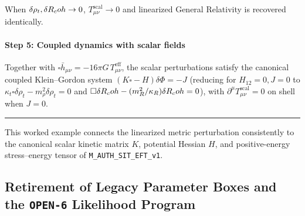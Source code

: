 When $\delta\rho_t, \delta R_coh \to 0$, $T_{\mu\nu}^{\mathrm{scal}} \to 0$ and linearized General Relativity is recovered identically.

\paragraph{Step 5: Coupled dynamics with scalar fields}

Together with $\square\bar{h}_{\mu\nu} = -16\pi G\,T_{\mu\nu}^{\mathrm{eff}}$, the scalar perturbations satisfy the canonical coupled Klein--Gordon system $(K\square - H)\delta\Phi = -J$ (reducing for $H_{12}=0, J=0$ to $\kappa_t\square\delta\rho_t - m_\rho^2\delta\rho_t = 0$ and $\square\delta R_coh - (m_R^2/\kappa_R)\delta R_coh = 0$), with $\partial^\mu T_{\mu\nu}^{\mathrm{scal}} = 0$ on shell when $J = 0$.

\medskip\hrule\medskip
This worked example connects the linearized metric perturbation consistently to the canonical scalar kinetic matrix $K$, potential Hessian $H$, and positive-energy stress--energy tensor of \texttt{M\_AUTH\_SIT\_EFT\_v1}.

\subsection{Retirement of Legacy Parameter Boxes and the \texttt{OPEN-6} Likelihood Program}

